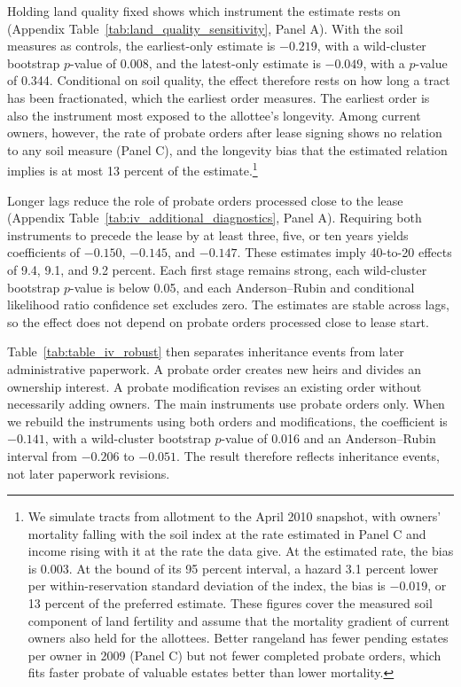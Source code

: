 \documentclass[12pt]{article}
\begin{document}
Holding land quality fixed shows which instrument the estimate rests on (Appendix Table~\ref{tab:land_quality_sensitivity}, Panel A). With the soil measures as controls, the earliest-only estimate is $-0.219$, with a wild-cluster bootstrap $p$-value of 0.008, and the latest-only estimate is $-0.049$, with a $p$-value of 0.344. Conditional on soil quality, the effect therefore rests on how long a tract has been fractionated, which the earliest order measures. The earliest order is also the instrument most exposed to the allottee's longevity. Among current owners, however, the rate of probate orders after lease signing shows no relation to any soil measure (Panel C), and the longevity bias that the estimated relation implies is at most 13 percent of the estimate.\footnote{We simulate tracts from allotment to the April 2010 snapshot, with owners' mortality falling with the soil index at the rate estimated in Panel C and income rising with it at the rate the data give. At the estimated rate, the bias is 0.003. At the bound of its 95 percent interval, a hazard 3.1 percent lower per within-reservation standard deviation of the index, the bias is $-0.019$, or 13 percent of the preferred estimate. These figures cover the measured soil component of land fertility and assume that the mortality gradient of current owners also held for the allottees. Better rangeland has fewer pending estates per owner in 2009 (Panel C) but not fewer completed probate orders, which fits faster probate of valuable estates better than lower mortality.}

Longer lags reduce the role of probate orders processed close to the lease (Appendix Table~\ref{tab:iv_additional_diagnostics}, Panel A). Requiring both instruments to precede the lease by at least three, five, or ten years yields coefficients of $-0.150$, $-0.145$, and $-0.147$. These estimates imply 40-to-20 effects of 9.4, 9.1, and 9.2 percent. Each first stage remains strong, each wild-cluster bootstrap $p$-value is below 0.05, and each Anderson--Rubin and conditional likelihood ratio confidence set excludes zero. The estimates are stable across lags, so the effect does not depend on probate orders processed close to lease start.

Table~\ref{tab:table_iv_robust} then separates inheritance events from later administrative paperwork. A probate order creates new heirs and divides an ownership interest. A probate modification revises an existing order without necessarily adding owners. The main instruments use probate orders only. When we rebuild the instruments using both orders and modifications, the coefficient is $-0.141$, with a wild-cluster bootstrap $p$-value of 0.016 and an Anderson--Rubin interval from $-0.206$ to $-0.051$. The result therefore reflects inheritance events, not later paperwork revisions.
\end{document}
